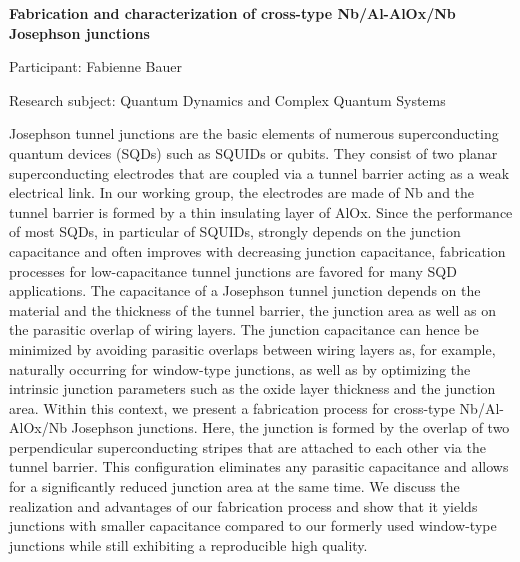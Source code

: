 \begin{minipage}[t]{1.0\textwidth}

\begin{center}

{{\large\bfseries Fabrication and characterization of cross-type Nb/Al-AlOx/Nb Josephson junctions}\par}

\end{center}

{\noindent Participant: Fabienne Bauer\par} 

{\noindent Research subject: Quantum Dynamics and Complex Quantum Systems\par}\medskip

\noindent Josephson tunnel junctions are the basic elements of numerous superconducting quantum devices (SQDs) such as SQUIDs or qubits. They consist of two planar superconducting electrodes that are coupled via a tunnel barrier acting as a weak electrical link. In our working group, the electrodes are made of Nb and the tunnel barrier is formed by a thin insulating layer of AlOx. Since the performance of most SQDs, in particular of SQUIDs, strongly depends on the junction capacitance and often improves with decreasing junction capacitance, fabrication processes for low-capacitance tunnel junctions are favored for many SQD applications. The capacitance of a Josephson tunnel junction depends on the material and the thickness of the tunnel barrier, the junction area as well as on the parasitic overlap of wiring layers. The junction capacitance can hence be minimized by avoiding parasitic overlaps between wiring layers as, for example, naturally occurring for window-type junctions, as well as by optimizing the intrinsic junction parameters such as the oxide layer thickness and the junction area. Within this context, we present a fabrication process for cross-type Nb/Al-AlOx/Nb Josephson junctions. Here, the junction is formed by the overlap of two perpendicular superconducting stripes that are attached to each other via the tunnel barrier. This configuration eliminates any parasitic capacitance and allows for a significantly reduced junction area at the same time. We discuss the realization and advantages of our fabrication process and show that it yields junctions with smaller capacitance compared to our formerly used window-type junctions while still exhibiting a reproducible high quality.\par\end{minipage}

